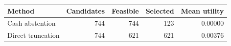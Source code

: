 \begin{tabular}{lrrrr}
\toprule
Method & Candidates & Feasible & Selected & Mean utility \\
\midrule
Cash abstention & 744 & 744 & 123 & 0.00000 \\
Direct truncation & 744 & 621 & 621 & 0.00376 \\
\bottomrule
\end{tabular}
